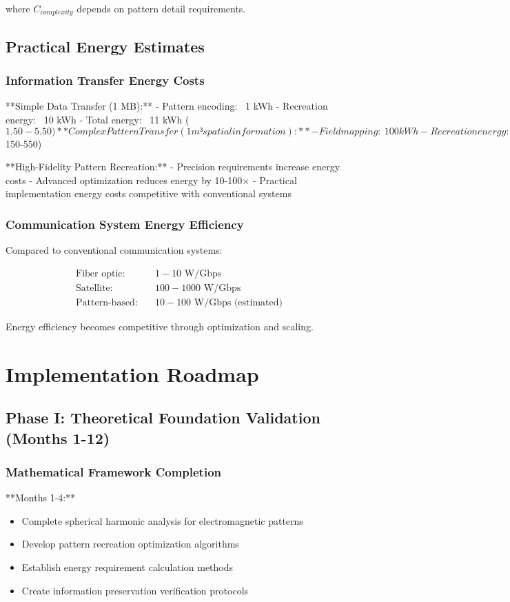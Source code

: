 \documentclass[12pt,a4paper]{article}
\begin{document}
where $C_{complexity}$ depends on pattern detail requirements.

\subsection{Practical Energy Estimates}

\subsubsection{Information Transfer Energy Costs}

**Simple Data Transfer (1 MB):**
- Pattern encoding: ~1 kWh
- Recreation energy: ~10 kWh  
- Total energy: ~11 kWh ($1.50-5.50)

**Complex Pattern Transfer (1 m³ spatial information):**
- Field mapping: ~100 kWh
- Recreation energy: ~1,000 kWh
- Total energy: ~1,100 kWh ($150-550)

**High-Fidelity Pattern Recreation:**
- Precision requirements increase energy costs
- Advanced optimization reduces energy by 10-100×
- Practical implementation energy costs competitive with conventional systems

\subsubsection{Communication System Energy Efficiency}

Compared to conventional communication systems:

\begin{align}
\text{Fiber optic:} &\quad 1-10 \text{ W/Gbps} \\
\text{Satellite:} &\quad 100-1000 \text{ W/Gbps} \\
\text{Pattern-based:} &\quad 10-100 \text{ W/Gbps (estimated)}
\end{align}

Energy efficiency becomes competitive through optimization and scaling.

\section{Implementation Roadmap}

\subsection{Phase I: Theoretical Foundation Validation (Months 1-12)}

\subsubsection{Mathematical Framework Completion}
**Months 1-4:**
\begin{itemize}
\item Complete spherical harmonic analysis for electromagnetic patterns
\item Develop pattern recreation optimization algorithms
\item Establish energy requirement calculation methods
\item Create information preservation verification protocols
\end{itemize}
\end{document}
